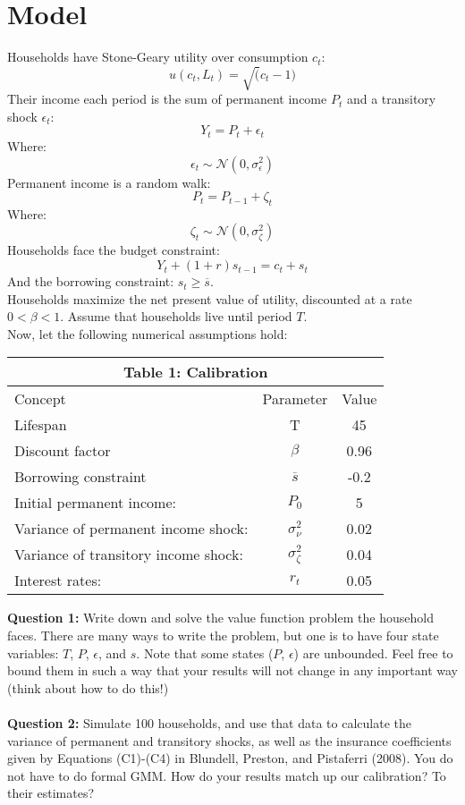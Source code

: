 \documentclass[11pt]{article}
\begin{document}
\section{Model}
Households have Stone-Geary utility over consumption $c_t$:
$$u(c_t,L_t)=\sqrt(c_t-1)$$
Their income each period is the sum of permanent income $P_t$ and a transitory shock $\epsilon_t$:
$$ Y_t=P_t+\epsilon_t$$
Where:
$$\epsilon_t\sim\mathcal{N}(0,\sigma^2_\epsilon)$$
Permanent income is a random walk:
$$P_t=P_{t-1}+\zeta_t$$
Where:
$$\zeta_t\sim\mathcal{N}(0,\sigma^2_\zeta)$$
Households face the budget constraint:
$$Y_t+(1+r)s_{t-1}=c_t+s_t$$
And the borrowing constraint:  $s_t\geq \overline{s}$.\\

Households maximize the net present value of utility, discounted at a rate $0<\beta<1$. Assume that households live until period $T$.\\

Now, let the following numerical assumptions hold:
\begin{table}[ht!]
\centering
\begin{tabular}{lcc}
\hline
\hline
\multicolumn{3}{c}{Table 1: Calibration}\\
\hline
Concept & Parameter & Value \\ 
Lifespan & T & 45 \\
Discount factor & $\beta$ & 0.96\\
Borrowing constraint & $\overline{s}$ & -0.2 \\
Initial permanent income:  & $P_0$ & 5\\
Variance of permanent income shock:  & $\sigma^2_\nu$ & 0.02\\
Variance of transitory income shock:  & $\sigma^2_\zeta$ & 0.04\\
Interest rates:  & $r_{t}$ & 0.05\\
\hline
\hline
\end{tabular}
\end{table}

\textbf{Question 1:} Write down and solve the value function problem the household faces.  There are many ways to write the problem, but one is to have four state variables:  $T$, $P$, $\epsilon$, and $s$.  Note that some states ($P$, $\epsilon$) are unbounded.  Feel free to bound them in such a way that your results will not change in any important way (think about how to do this!)\\
\ \\
\textbf{Question 2:} Simulate 100 households, and use that data to calculate the variance of permanent and transitory shocks, as well as the insurance coefficients given by Equations (C1)-(C4) in Blundell, Preston, and Pistaferri (2008).  You do not have to do formal GMM.  How do your results match up our calibration?  To their estimates?  \\
\end{document}
